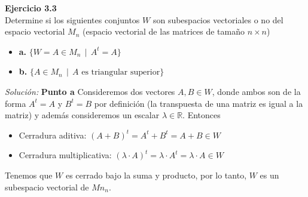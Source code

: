 \documentclass{article}
\newenvironment{problem}[2][Ejercicio]
    { \begin{mdframed}[backgroundcolor=gray!20] \textbf{#1 #2} \\}
    {  \end{mdframed}}
\newenvironment{solution}
    {\textit{Solución:}}
    {}
\begin{document}
\begin{problem}{3.3}
    Determine si los siguientes conjuntos $W$ son subespacios vectoriales o no del espacio vectorial $M_n$ (espacio vectorial de las matrices de tamaño $n \times n$)
\begin{itemize}
\item 
\textbf{a.} $\{ W = A \in M_n \ \ | \  \ A^t = A \}$
\item 
\textbf{b.} $\{ A \in M_n \ \ | \ \ A \text{ es triangular superior} \}$
\end{itemize}
\end{problem}
\begin{solution}
    \textbf{Punto a}
Consideremos dos vectores $A,B \in W$, donde ambos son de la forma $A^t = A$ y $B^t = B$ por definición (la transpuesta de una matriz es igual a la matriz) y además consideremos un escalar $\lambda \in \mathbb{R}$. Entonces
\begin{itemize}
\item 
Cerradura aditiva: $(A + B)^t = A^t + B^t = A + B \in W$
\item 
Cerradura multiplicativa: $(\lambda \cdot A)^t = \lambda \cdot A^t = \lambda \cdot A \in W$
\end{itemize}

Tenemos que $W$ es cerrado bajo la suma y producto, por lo tanto, $W$ es un subespacio vectorial de $Mn_n$.


\end{solution}
\end{document}
